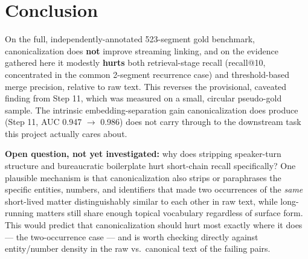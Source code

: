 \documentclass[11pt,a4paper]{article}
\begin{document}
\section{Conclusion}

On the full, independently-annotated 523-segment gold benchmark, canonicalization does
\textbf{not} improve streaming linking, and on the evidence gathered here it modestly
\textbf{hurts} both retrieval-stage recall (recall@10, concentrated in the common 2-segment
recurrence case) and threshold-based merge precision, relative to raw text. This reverses
the provisional, caveated finding from Step 11, which was measured on a small, circular
pseudo-gold sample. The intrinsic embedding-separation gain canonicalization does produce
(Step 11, AUC 0.947 $\to$ 0.986) does not carry through to the downstream task this project
actually cares about.

\textbf{Open question, not yet investigated:} why does stripping speaker-turn structure and
bureaucratic boilerplate hurt short-chain recall specifically? One plausible mechanism is
that canonicalization also strips or paraphrases the specific entities, numbers, and
identifiers that made two occurrences of the \emph{same} short-lived matter distinguishably
similar to each other in raw text, while long-running matters still share enough topical
vocabulary regardless of surface form. This would predict that canonicalization should hurt
most exactly where it does --- the two-occurrence case --- and is worth checking directly
against entity/number density in the raw vs.\ canonical text of the failing pairs.
\end{document}
